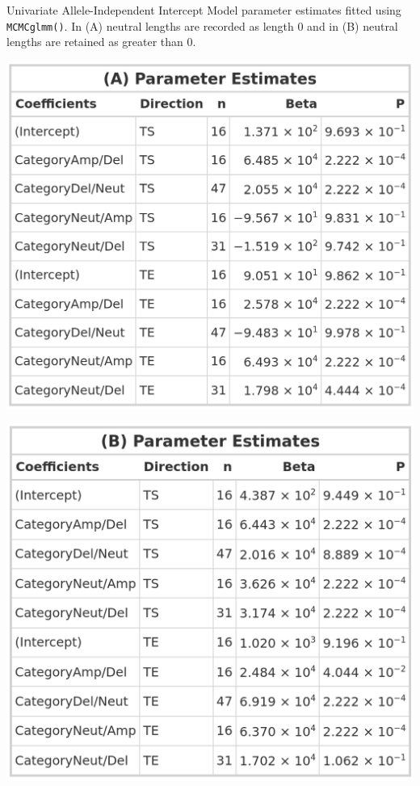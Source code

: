 \begin{table}[!htb]
    \caption[Univariate Allele-Independent Intercept Model parameter estimates fitted using \texttt{MCMCglmm()}.]{Univariate Allele-Independent Intercept Model parameter estimates fitted using \texttt{MCMCglmm()}. In (A) neutral lengths are recorded as length 0 and in (B) neutral lengths are retained as greater than 0.}
     \begin{subtable}[t]{.49\textwidth}
      \centering
      \includegraphics[width = 1\textwidth]{../tables/Chapter_5/Univariate_MCMC_7_AI_Model.png}
    \end{subtable}%
    \hspace{0.5cm}
     \begin{subtable}[t]{.49\textwidth}
      \centering
         \includegraphics[width = 1\textwidth]{../tables/Chapter_5/Univariate_MCMC_7_Neut_AI_Model.png}
    \end{subtable} 
\end{table}

